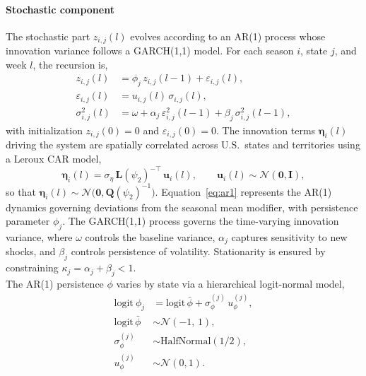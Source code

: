 \documentclass[11pt]{article}
\newcommand{\Normal}{\mathcal{N}}
\newcommand{\HalfNormal}{\text{HalfNormal}}
\begin{document}
\paragraph{Stochastic component}
The stochastic part $z_{i,j}(l)$ evolves according to an AR(1) process whose innovation variance follows a GARCH(1,1) model. For each season $i$, state $j$, and week $l$, the recursion is,
\begin{align}
	z_{i,j}(l) &= \phi_j \,z_{i,j}(l-1) + \varepsilon_{i,j}(l), \\ \label{eq:ar1}
	\varepsilon_{i,j}(l) &= u_{i,j}(l)\,\sigma_{i,j}(l), \\
    \sigma^2_{i,j}(l) &= \omega + \alpha_j\,\varepsilon^2_{i,j}(l-1) + \beta_j\,\sigma^2_{i,j}(l-1),
\end{align}
with initialization $z_{i,j}(0) = 0$ and $\varepsilon_{i,j}(0) = 0$. The innovation terms $\bm{\eta}_i(l)$ driving the system are spatially correlated across U.S.\ states and territories using a Leroux CAR model,
\begin{equation}
    \bm{\eta}_i(l) = \sigma_\eta \, \bm{L}(\psi_2)^{-\top}\, \bm{u}_i(l), 
    \qquad \bm{u}_i(l) \sim \Normal(\bm{0}, \bm{I}),
\end{equation}
so that $\bm{\eta}_i(l) \sim \Normal\big(\bm{0}, \bm{Q}(\psi_2)^{-1}\big)$. Equation~\eqref{eq:ar1} represents the AR(1) dynamics governing deviations from the seasonal mean modifier, with persistence parameter $\phi_j$. The GARCH(1,1) process governs the time-varying innovation variance, where $\omega$ controls the baseline variance, $\alpha_j$ captures sensitivity to new shocks, and $\beta_j$ controls persistence of volatility. Stationarity is ensured by constraining $\kappa_j = \alpha_j + \beta_j < 1$.\\

The AR(1) persistence $\phi$ varies by state via a hierarchical logit-normal model,
\begin{align}
	\text{logit}~ \phi_j &= \text{logit}\,\bar{\phi} + \sigma^{(j)}_\phi\, u^{(j)}_{\phi}, \nonumber \\	
	\text{logit}\,\bar{\phi} &\sim \Normal(-1,\, 1), \nonumber\\
	\sigma^{(j)}_\phi &\sim \HalfNormal\!\left(1/2\right), \nonumber\\
	u^{(j)}_{\phi} &\sim \Normal(0,1).
\end{align}
\end{document}

